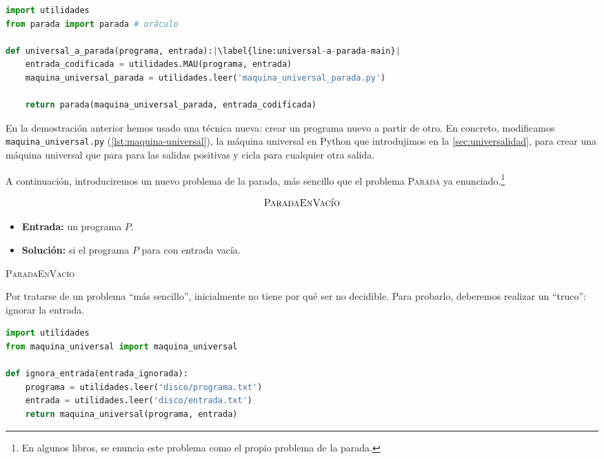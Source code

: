 \begin{lstlisting}[language=Python, caption=\lstinline{universal_a_parada.py},label={lst:universal-a-parada}]
import utilidades
from parada import parada # oráculo

def universal_a_parada(programa, entrada):|\label{line:universal-a-parada-main}|
    entrada_codificada = utilidades.MAU(programa, entrada)
    maquina_universal_parada = utilidades.leer('maquina_universal_parada.py')

    return parada(maquina_universal_parada, entrada_codificada)
\end{lstlisting}

En la demostración anterior hemos usado una técnica nueva: crear un programa nuevo a partir de otro. En concreto, modificamos \texttt{maquina\_universal.py} (\cref{lst:maquina-universal}), la máquina universal en Python que introdujimos en la \cref{sec:universalidad}, para crear una máquina universal que para para las salidas positivas y cicla para cualquier otra salida.

A continuación, introduciremos un nuevo problema de la parada, más sencillo que el problema \textsc{Parada} ya enunciado.\footnote{En algunos libros, se enuncia este problema como el propio problema de la parada.}

\vspace{8pt}
\begin{problema}
\begin{framed}
$$\text{\textsc{ParadaEnVacío}}$$

\begin{itemize}
    \item \textbf{Entrada:} un programa $P$.
    \item \textbf{Solución:} si el programa $P$ para con entrada vacía.
\end{itemize}
\end{framed}
\caption{\textsc{ParadaEnVacío}}
\label{prob:parada-en-vacio}
\end{problema}

Por tratarse de un problema ``más sencillo'', inicialmente no tiene por qué ser no decidible. Para probarlo, deberemos realizar un ``truco'': ignorar la entrada.
\vspace{8pt}
\begin{lstlisting}[language=Python, caption=\lstinline{ignora_entrada.py},label={lst:ignora-entrada}]
import utilidades
from maquina_universal import maquina_universal

def ignora_entrada(entrada_ignorada):
    programa = utilidades.leer('disco/programa.txt')
    entrada = utilidades.leer('disco/entrada.txt')
    return maquina_universal(programa, entrada)
\end{lstlisting}

